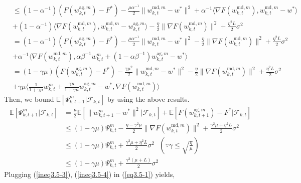 \documentclass[11pt]{article}
\begin{document}
\begin{align*}
    &\leq (1-\alpha^{-1})(F(w_{k, t}^{\textrm{ag}, m})-F^*) - \frac{\mu\alpha^{-1}}{2}\|w_{k, t}^{\textrm{md}, m}-w^*\|^2 + \alpha^{-1} \langle \nabla F(w_{k, t}^{\textrm{md}, m}), w_{k, t}^{\textrm{md}, m}-w^*\rangle \\
    &+ (1-\alpha^{-1})\langle \nabla F(w_{k, t}^{\textrm{md}, m}), w_{k, t}^{\textrm{md}, m} - w_{k, t}^{\textrm{ag}, m}\rangle - \frac{\eta}{2}\|\nabla F(w_{k, t}^{\textrm{md}, m})\|^2 + \frac{\eta^2 L}{2}\sigma^2 \\
    &= (1-\alpha^{-1})(F(w_{k, t}^{\textrm{ag}, m})-F^*) - \frac{\mu\alpha^{-1}}{2}\|w_{k, t}^{\textrm{md}, m}-w^*\|^2 - \frac{\eta}{2}\|\nabla F(w_{k, t}^{\textrm{md}, m})\|^2 + \frac{\eta^2 L}{2}\sigma^2 \\
    &+ \alpha^{-1} \langle \nabla F(w_{k, t}^{\textrm{md}, m}), \alpha\beta^{-1}w_{k, t}^m + (1 - \alpha\beta^{-1})w_{k, t}^{\textrm{ag}, m} - w^*\rangle \\
    &= (1-\gamma\mu)(F(w_{k, t}^{\textrm{ag}, m})-F^*) - \frac{\gamma\mu^2}{2}\|w_{k, t}^{\textrm{md}, m}-w^*\|^2 - \frac{\eta}{2}\|\nabla F(w_{k, t}^{\textrm{md}, m})\|^2 + \frac{\eta^2 L}{2}\sigma^2 \\
    &+ \gamma\mu\langle \frac{1}{1+\gamma\mu}w_{k, t}^m + \frac{\gamma\mu}{1+\gamma\mu}w_{k, t}^{\textrm{ag}, m} - w^*, \nabla F(w_{k, t}^{\textrm{md}, m})\rangle
\end{align*}
Then, we bound $\mathbb{E}[\Psi_{k, t+1}^m|\mathcal{F}_{k, t}]$ by using the above results.
\begin{align} \label{ineq3.5-4}
    \mathbb{E}[\Psi_{k, t+1}^m|\mathcal{F}_{k, t}] &= \frac{\mu}{2}\mathbb{E}[\|w_{k, t+1}^m-w^*\|^2|\mathcal{F}_{k, t}] + \mathbb{E}[F(w_{k, t+1}^{\textrm{ag}, m}) - F^*|\mathcal{F}_{k, t}] \nonumber\\
    &\leq (1-\gamma\mu)\Psi_{k, t}^m - \frac{\eta - \gamma^2\mu}{2}\|\nabla F(w_{k, t}^{\textrm{md}, m})\|^2 + \frac{\gamma^2\mu + \eta^2 L}{2}\sigma^2 \nonumber\\
    &\leq (1-\gamma\mu)\Psi_{k, t}^m  + \frac{\gamma^2\mu + \eta^2 L}{2}\sigma^2 \textrm{ }(\because \gamma \leq \sqrt{\frac{\eta}{\mu}}) \nonumber\\
    &\leq (1-\gamma\mu)\Psi_{k, t}^m  + \frac{\gamma^2(\mu+L)}{2}\sigma^2
\end{align}
Plugging (\ref{ineq3.5-3}), (\ref{ineq3.5-4}) in (\ref{eq3.5-1}) yields,
\end{document}
